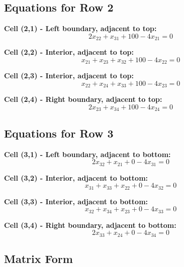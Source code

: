 \documentclass{article}
\begin{document}
\subsection{Equations for Row 2}

\textbf{Cell (2,1) - Left boundary, adjacent to top:}
\begin{equation}
2x_{22} + x_{31} + 100 - 4x_{21} = 0
\label{eq:21}
\end{equation}

\textbf{Cell (2,2) - Interior, adjacent to top:}
\begin{equation}
x_{21} + x_{23} + x_{32} + 100 - 4x_{22} = 0
\label{eq:22}
\end{equation}

\textbf{Cell (2,3) - Interior, adjacent to top:}
\begin{equation}
x_{22} + x_{24} + x_{33} + 100 - 4x_{23} = 0
\label{eq:23}
\end{equation}

\textbf{Cell (2,4) - Right boundary, adjacent to top:}
\begin{equation}
2x_{23} + x_{34} + 100 - 4x_{24} = 0
\label{eq:24}
\end{equation}

\subsection{Equations for Row 3}

\textbf{Cell (3,1) - Left boundary, adjacent to bottom:}
\begin{equation}
2x_{32} + x_{21} + 0 - 4x_{31} = 0
\label{eq:31}
\end{equation}

\textbf{Cell (3,2) - Interior, adjacent to bottom:}
\begin{equation}
x_{31} + x_{33} + x_{22} + 0 - 4x_{32} = 0
\label{eq:32}
\end{equation}

\textbf{Cell (3,3) - Interior, adjacent to bottom:}
\begin{equation}
x_{32} + x_{34} + x_{23} + 0 - 4x_{33} = 0
\label{eq:33}
\end{equation}

\textbf{Cell (3,4) - Right boundary, adjacent to bottom:}
\begin{equation}
2x_{33} + x_{24} + 0 - 4x_{34} = 0
\label{eq:34}
\end{equation}

\subsection{Matrix Form}
\end{document}
